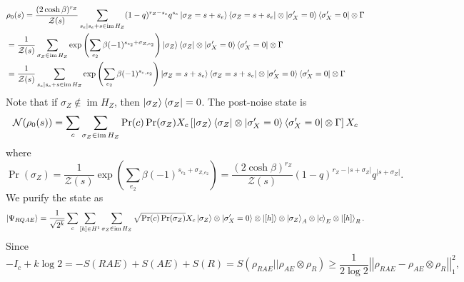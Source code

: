 \documentclass[twoside,english,aps,showpacs,pra,superscriptaddress]{revtex4-2}
\DeclareMathOperator{\im}{im}
\newcommand{\norm}[1]{\left| \left| {#1}\right|\right|}
\begin{document}
\begin{equation}
    \begin{aligned}
        &\rho_0(s) =  \frac{(2\cosh\beta)^{r_Z}}{\mathcal{Z}(s)}\sum_{s_e|s_e+s\in \im H_Z}  (1-q)^{r_Z - s_e} q^{s_e} \ket{\sigma_{Z} = s+s_e}\bra{\sigma_{Z} = s+s_e} \otimes \ket{\sigma_{X}' = 0}\bra{\sigma_{X}' = 0} \otimes \Gamma\\
        &=  \frac{1}{\mathcal{Z}(s)}\sum_{\sigma_{Z}\in \im H_Z}  \exp\left(\sum_{e_2}\beta (-1)^{{s}_{e_2}+ \sigma_{Z,e_2}}\right) \ket{\sigma_{Z}}\bra{\sigma_{Z}}\otimes \ket{\sigma_{X}' = 0}\bra{\sigma_{X}' = 0} \otimes \Gamma\\
        &=  \frac{1}{\mathcal{Z}(s)}\sum_{s_e|s_e+s\in \im H_Z}  \exp\left(\sum_{e_2}\beta (-1)^{{s_e}_{,e_2}}\right) \ket{\sigma_{Z} = s+s_e}\bra{\sigma_{Z} = s+s_e}  \otimes \ket{\sigma_{X}' = 0}\bra{\sigma_{X}' = 0} \otimes \Gamma
    \end{aligned}
    \end{equation}
Note that if $\sigma_Z \notin \im H_Z$, then $\ket{\sigma_Z}\bra{\sigma_Z}  = 0$.
The post-noise state is 
\begin{equation}
    \begin{aligned}
        &\mathcal N(\rho_0(s)) =\sum_c \sum_{\sigma_{Z}\in \im H_Z}  \Pr(c) \Pr(\sigma_Z) X_c \left[\ket{\sigma_{Z}}\bra{\sigma_{Z}} \otimes \ket{\sigma_{X}' = 0}\bra{\sigma_{X}' = 0} \otimes \Gamma \right] X_c\\
    \end{aligned}
\end{equation}
where 
\begin{equation}
    \Pr(\sigma_Z) = \frac{1}{\mathcal{Z}(s)} \exp\left(\sum_{e_2}\beta (-1)^{{s}_{e_2}+ \sigma_{Z,e_2}}\right) = \frac{(2\cosh \beta)^{r_Z}}{\mathcal{Z}(s)} (1-q)^{r_Z -|s+\sigma_Z|} q^{|s+\sigma_Z|}.
\end{equation}
We purify the state as 
\begin{equation}
    \ket{\Psi_{RQAE}} = \frac{1}{\sqrt{2^k}} \sum_c \sum_{[h] \in H^1} \sum_{\sigma_{Z}\in \im H_Z}  \sqrt{\Pr(c) \Pr(\sigma_Z)} X_c \ket{\sigma_{Z}}\otimes \ket{\sigma_{X}' = 0} \otimes \ket{[h]} \otimes \ket{\sigma_Z}_A \otimes \ket{c}_E\otimes \ket{[h]}_R.
\end{equation}
Since
\begin{equation}
    -I_c +k \log 2 = - S(RAE) + S(AE) + S(R) = S(\rho_{RAE}||\rho_{AE} \otimes \rho_{R}) \geq \frac{1}{2\log 2} \norm{\rho_{RAE} - \rho_{AE} \otimes \rho_{R}}^2_1,
\end{equation}
\end{document}
